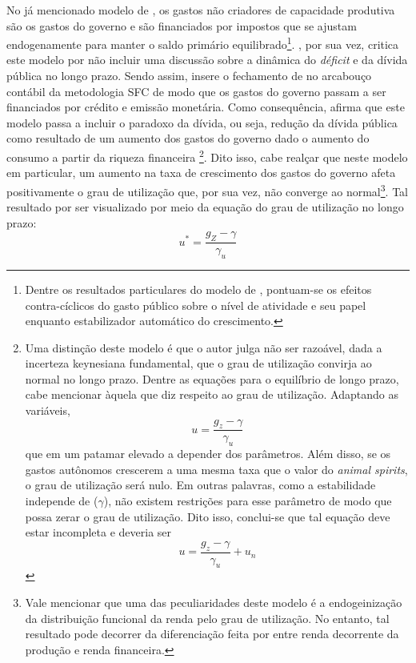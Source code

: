 No já mencionado modelo de \textcite{allain_tackling_2015}, os gastos não criadores de capacidade produtiva são os gastos do governo e são financiados por impostos que se ajustam endogenamente para manter o saldo primário equilibrado\footnote{
	Dentre os resultados particulares do modelo de \textcite{allain_tackling_2015}, pontuam-se os efeitos contra-cíclicos do gasto público sobre o nível de atividade e seu papel enquanto estabilizador automático do crescimento.
}.  
\textcite{hein_autonomous_2018}, por sua vez, critica este modelo por não incluir uma discussão sobre a dinâmica do \textit{déficit} e da dívida pública no longo prazo. 
Sendo assim, insere o fechamento de \textcite{allain_tackling_2015} no arcabouço contábil da metodologia SFC de modo que os gastos do governo passam a ser financiados por crédito e emissão monetária. Como consequência, \textcite{hein_autonomous_2018} afirma que este modelo passa a incluir o paradoxo da dívida, ou seja, redução da dívida pública como resultado de um aumento dos gastos do governo dado o aumento do consumo a partir da riqueza financeira
\footnote{
	Uma distinção deste modelo é que o autor julga não ser razoável, dada a incerteza keynesiana fundamental, que o grau de utilização convirja ao normal no longo prazo.
	Dentre as equações para o equilíbrio de longo prazo, cabe mencionar àquela que diz respeito ao grau de utilização. Adaptando as variáveis,
	$$
	u = \frac{g_z - \gamma}{\gamma_u}
	$$
	que  em um patamar elevado a depender dos parâmetros. Além disso, se os gastos autônomos crescerem a uma mesma taxa que o valor do \textit{animal spirits}, o grau de utilização será nulo. Em outras palavras, como a estabilidade independe de ($\gamma$), não existem restrições para esse parâmetro de modo que possa zerar o grau de utilização. Dito isso, conclui-se que tal equação deve estar incompleta e deveria ser
	$$
	u = \frac{g_z - \gamma}{\gamma_u} + u_n
	$$
}. 
Dito isso, cabe realçar que neste modelo em particular, um aumento na taxa de crescimento dos gastos do governo afeta positivamente o grau de utilização que, por sua vez, não converge ao normal\footnote{
	Vale mencionar que uma das peculiaridades deste modelo é a endogeinização da distribuição funcional da renda pelo grau de utilização. No entanto, tal resultado pode decorrer da diferenciação feita por \textcite{hein_autonomous_2018} entre renda decorrente da produção e renda financeira.
}.
Tal resultado por ser visualizado por meio da equação do grau de utilização no longo prazo:
\begin{equation}
\label{Eq_Hein}
u^* = \frac{g_Z - \gamma}{\gamma_u}
\end{equation}
